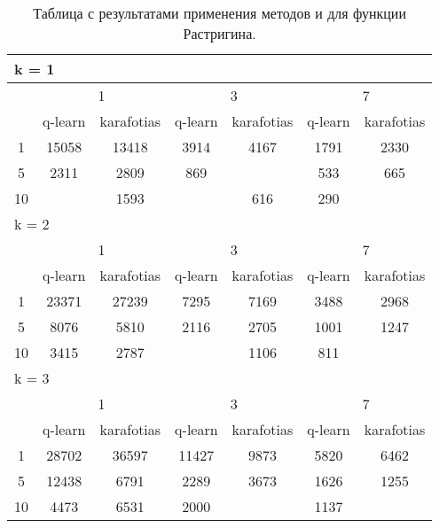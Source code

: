 \begin{table}
  \centering
  \begin{tabular}{|*7{c|}}
    \hline
    \multicolumn{7}{|l|}{k = 1} \\
    \hline
    \multirow{2}{*}{\diagbox{$\mu$}{$\lambda$}} & \multicolumn{2}{c|}{1} & \multicolumn{2}{c|}{3} & \multicolumn{2}{c|}{7} \\
    \cline{2-7}
    & q-learn & karafotias & q-learn & karafotias & q-learn & karafotias \\
    \hline
    1 & 15058 & 13418 & 3914 & 4167 & 1791 & 2330 \\
    \hline
    5 & 2311 & 2809 & 869& \cellcolor{olive}{748} & 533 & 665 \\
    \hline
    10 & \cellcolor{olive}{1497} & 1593& \cellcolor{olive}{488} & 616 & 290& \cellcolor{olive}{235} \\
    \hline
    \multicolumn{7}{|l|}{k = 2} \\
    \hline
    \multirow{2}{*}{\diagbox{$\mu$}{$\lambda$}} & \multicolumn{2}{c|}{1} & \multicolumn{2}{c|}{3} & \multicolumn{2}{c|}{7} \\
    \cline{2-7}
    & q-learn & karafotias & q-learn & karafotias & q-learn & karafotias \\
    \hline
    1 & 23371 & 27239 & 7295 & 7169 & 3488 & 2968 \\
    \hline
    5 & 8076 & 5810 & 2116 & 2705 & 1001 & 1247 \\
    \hline
    10 & 3415 & 2787& \cellcolor{olive}{1037} & 1106 & 811& \cellcolor{olive}{666} \\
    \hline
    \multicolumn{7}{|l|}{k = 3} \\
    \hline
    \multirow{2}{*}{\diagbox{$\mu$}{$\lambda$}} & \multicolumn{2}{c|}{1} & \multicolumn{2}{c|}{3} & \multicolumn{2}{c|}{7} \\
    \cline{2-7}
    & q-learn & karafotias & q-learn & karafotias & q-learn & karafotias \\
    \hline
    1 & 28702 & 36597 & 11427 & 9873 & 5820 & 6462 \\
    \hline
    5 & 12438 & 6791 & 2289 & 3673 & 1626 & 1255 \\
    \hline
    10 & 4473 & 6531 & 2000 & \cellcolor{olive}{1650} & 1137 & \cellcolor{olive}{1098} \\
    \hline
  \end{tabular}
  \captionsetup{justification=centering}
  \caption{Таблица с результатами применения методов  и  для функции Растригина.}
\end{table}

